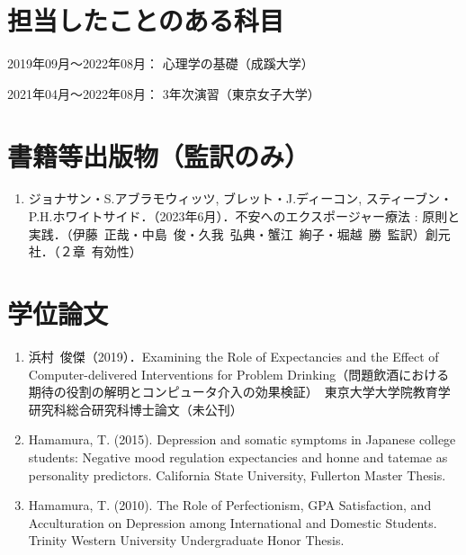 \documentclass[11pt,a4paper]{article}
\begin{document}
\section{担当したことのある科目}
\begin{description}
	\item 2019年09月～2022年08月： 心理学の基礎（成蹊大学）
	\item 2021年04月〜2022年08月： 3年次演習（東京女子大学）
\end{description}

\section{書籍等出版物（監訳のみ）}
	\begin{enumerate}
		\item ジョナサン・S.アブラモウィッツ, ブレット・J.ディーコン, スティーブン・P.H.ホワイトサイド．（2023年6月）．不安へのエクスポージャー療法 : 原則と実践．（伊藤\ 正哉・中島\ 俊・久我\ 弘典・蟹江\ 絢子・堀越\ 勝\ 監訳）創元社．（２章\ 有効性）
	\end{enumerate}

\section{学位論文}
	\begin{enumerate}
		\item 浜村\ 俊傑（2019）．Examining the Role of Expectancies and the Effect of Computer-delivered Interventions for Problem Drinking（問題飲酒における期待の役割の解明とコンピュータ介入の効果検証）　東京大学大学院教育学研究科総合研究科博士論文（未公刊）
		\item Hamamura, T. (2015). Depression and somatic symptoms in Japanese college students: Negative mood regulation expectancies and honne and tatemae as personality predictors. California State University, Fullerton Master Thesis.
		\item Hamamura, T.  (2010). The Role of Perfectionism, GPA Satisfaction, and Acculturation on Depression among International and Domestic Students. Trinity Western University Undergraduate Honor Thesis.
	\end{enumerate}
\end{document}
